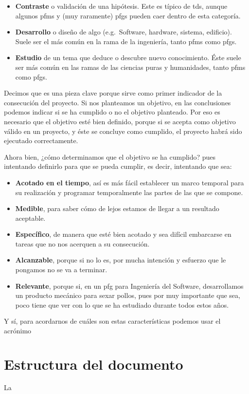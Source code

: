         \begin{itemize}
            \item \textbf{Contraste} o validación de una hipótesis. Este es típico de \glspl{td}, aunque algunos \glspl{pfm} y (muy raramente) \glspl{pfg} pueden caer dentro de esta categoría.
            \item \textbf{Desarrollo} o diseño de algo (e.g.~Software, hardware, sistema, edificio). Suele ser el más común en la rama de la ingeniería, tanto \glspl{pfm} como \glspl{pfg}.
            \item \textbf{Estudio} de un tema que deduce o descubre nuevo conocimiento. Éste suele ser más común en las ramas de las ciencias puras y humanidades, tanto \glspl{pfm} como \glspl{pfg}.
        \end{itemize}

        Decimos que es una pieza clave porque sirve como primer indicador de la consecución del proyecto. Si nos planteamos un objetivo, en las conclusiones podemos indicar si se ha cumplido o no el objetivo planteado. Por eso es necesario que el objetivo esté bien definido, porque si se acepta como objetivo válido en un proyecto, y éste se concluye como cumplido, el proyecto habrá sido ejecutado correctamente.

        Ahora bien, ¿cómo determinamos que el objetivo se ha cumplido? pues intentando definirlo para que se pueda cumplir, es decir, intentando que sea:

        \begin{itemize}
            \item \textbf{Acotado en el tiempo}, así es más fácil establecer un marco temporal para su realización y programar temporalmente las partes de las que se compone.
            \item \textbf{Medible}, para saber cómo de lejos estamos de llegar a un resultado aceptable.
            \item \textbf{Específico}, de manera que esté bien acotado y sea difícil embarcarse en tareas que no nos acerquen a su consecución.
            \item \textbf{Alcanzable}, porque si no lo es, por mucha intención y esfuerzo que le pongamos no se va a terminar.
            \item \textbf{Relevante}, porque si, en un \gls{pfg} para Ingeniería del Software, desarrollamos un producto mecánico para sexar pollos, pues por muy importante que sea, poco tiene que ver con lo que se ha estudiado durante todos estos años.
        \end{itemize}

        Y sí, para acordarnos de cuáles son estas características podemos usar el acrónimo %

\section{Estructura del documento}
    La